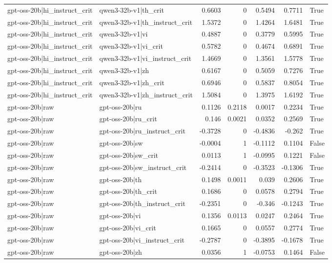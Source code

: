 \begin{table}
\begin{tabular}{l l r r r r l}
gpt-oss-20b|hi_instruct_crit & qwen3-32b-v1|th_crit & 0.6603 & 0 & 0.5494 & 0.7711 & True \\
gpt-oss-20b|hi_instruct_crit & qwen3-32b-v1|th_instruct_crit & 1.5372 & 0 & 1.4264 & 1.6481 & True \\
gpt-oss-20b|hi_instruct_crit & qwen3-32b-v1|vi & 0.4887 & 0 & 0.3779 & 0.5995 & True \\
gpt-oss-20b|hi_instruct_crit & qwen3-32b-v1|vi_crit & 0.5782 & 0 & 0.4674 & 0.6891 & True \\
gpt-oss-20b|hi_instruct_crit & qwen3-32b-v1|vi_instruct_crit & 1.4669 & 0 & 1.3561 & 1.5778 & True \\
gpt-oss-20b|hi_instruct_crit & qwen3-32b-v1|zh & 0.6167 & 0 & 0.5059 & 0.7276 & True \\
gpt-oss-20b|hi_instruct_crit & qwen3-32b-v1|zh_crit & 0.6946 & 0 & 0.5837 & 0.8054 & True \\
gpt-oss-20b|hi_instruct_crit & qwen3-32b-v1|zh_instruct_crit & 1.5084 & 0 & 1.3975 & 1.6192 & True \\
gpt-oss-20b|raw & gpt-oss-20b|ru & 0.1126 & 0.2118 & 0.0017 & 0.2234 & True \\
gpt-oss-20b|raw & gpt-oss-20b|ru_crit & 0.146 & 0.0021 & 0.0352 & 0.2569 & True \\
gpt-oss-20b|raw & gpt-oss-20b|ru_instruct_crit & -0.3728 & 0 & -0.4836 & -0.262 & True \\
gpt-oss-20b|raw & gpt-oss-20b|sw & -0.0004 & 1 & -0.1112 & 0.1104 & False \\
gpt-oss-20b|raw & gpt-oss-20b|sw_crit & 0.0113 & 1 & -0.0995 & 0.1221 & False \\
gpt-oss-20b|raw & gpt-oss-20b|sw_instruct_crit & -0.2414 & 0 & -0.3523 & -0.1306 & True \\
gpt-oss-20b|raw & gpt-oss-20b|th & 0.1498 & 0.0011 & 0.039 & 0.2606 & True \\
gpt-oss-20b|raw & gpt-oss-20b|th_crit & 0.1686 & 0 & 0.0578 & 0.2794 & True \\
gpt-oss-20b|raw & gpt-oss-20b|th_instruct_crit & -0.2351 & 0 & -0.346 & -0.1243 & True \\
gpt-oss-20b|raw & gpt-oss-20b|vi & 0.1356 & 0.0113 & 0.0247 & 0.2464 & True \\
gpt-oss-20b|raw & gpt-oss-20b|vi_crit & 0.1665 & 0 & 0.0557 & 0.2774 & True \\
gpt-oss-20b|raw & gpt-oss-20b|vi_instruct_crit & -0.2787 & 0 & -0.3895 & -0.1678 & True \\
gpt-oss-20b|raw & gpt-oss-20b|zh & 0.0356 & 1 & -0.0753 & 0.1464 & False \\

\end{tabular}
\end{table}
